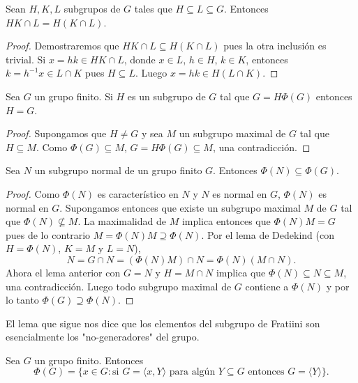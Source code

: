 \begin{lemma}[Dedekind]
	\label{lemma:Dedekind}
	Sean $H,K,L$ subgrupos de $G$ tales que $H\subseteq L\subseteq G$. Entonces
	$HK\cap L=H(K\cap L)$.
\end{lemma}

\begin{proof}
	Demostraremos que $HK\cap L\subseteq H(K\cap L)$ pues la otra inclusión es
	trivial. Si $x=hk\in HK\cap L$, donde $x\in L$, $h\in H$, $k\in K$,
	entonces $k=h^{-1}x\in L\cap K$ pues $H\subseteq L$. Luego $x=hk\in H(L\cap
	K)$.
\end{proof}

\begin{lemma}
	\label{lemma:G=HPhi(G)}
	Sea $G$ un grupo finito. Si $H$ es un subgrupo de $G$ tal que $G=H\Phi(G)$
	entonces $H=G$.
\end{lemma}

\begin{proof}
	Supongamos que $H\ne G$ y sea $M$ un subgrupo maximal de $G$ tal que
	$H\subseteq M$. Como $\Phi(G)\subseteq M$, $G=H\Phi(G)\subseteq M$, una
	contradicción.
\end{proof}

\begin{proposition}
	\label{proposition:phi(N)phi(G)}
	Sea $N$ un subgrupo normal de un grupo finito $G$. Entonces
	$\Phi(N)\subseteq\Phi(G)$.
\end{proposition}

\begin{proof}
	Como $\Phi(N)$ es característico en $N$ y $N$ es normal en $G$, $\Phi(N)$
	es normal en $G$.  Supongamos entonces que existe un subgrupo maximal $M$ de $G$ tal que
	$\Phi(N)\not\subseteq M$.  La maximalidad de $M$ implica entonces que $\Phi(N)M=G$
	pues de lo contrario $M=\Phi(N)M\supseteq\Phi(N)$.  Por el lema de
	Dedekind (con $H=\Phi(N)$, $K=M$ y $L=N$), 
	\[
		N=G\cap N=(\Phi(N)M)\cap N=\Phi(N)(M\cap N).
	\]
	Ahora el lema anterior con $G=N$ y $H=M\cap N$ implica que $\Phi(N)\subseteq
	N\subseteq M$, una contradicción. Luego todo subgrupo maximal de $G$
	contiene a $\Phi(N)$ y por lo tanto $\Phi(G)\supseteq\Phi(N)$. 
\end{proof}

El lema que sigue nos dice que los elementos del subgrupo de Fratiini son esencialmente
los "no-generadores" del grupo. 

\begin{lemma}
	\label{lemma:nongenerators}
	Sea $G$ un grupo finito. Entonces 
	\[
	\Phi(G)=\{x\in G:\text{si $G=\langle x,Y\rangle$ para algún $Y\subseteq G$ entonces $G=\langle Y\rangle$}\}.
	\]
\end{lemma}

